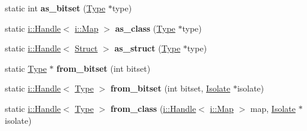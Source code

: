 \begin{DoxyCompactItemize}
\item 
\hypertarget{structv8_1_1internal_1_1_heap_type_config_a5cb05680ba0fa5241853ec9bc4a7a214}{}static int {\bfseries as\+\_\+bitset} (\hyperlink{classv8_1_1internal_1_1_type_impl}{Type} $\ast$type)\label{structv8_1_1internal_1_1_heap_type_config_a5cb05680ba0fa5241853ec9bc4a7a214}

\item 
\hypertarget{structv8_1_1internal_1_1_heap_type_config_ad7c5f1ca8b299f310a5259ac13e14752}{}static \hyperlink{classv8_1_1internal_1_1_handle}{i\+::\+Handle}$<$ \hyperlink{classv8_1_1internal_1_1_map}{i\+::\+Map} $>$ {\bfseries as\+\_\+class} (\hyperlink{classv8_1_1internal_1_1_type_impl}{Type} $\ast$type)\label{structv8_1_1internal_1_1_heap_type_config_ad7c5f1ca8b299f310a5259ac13e14752}

\item 
\hypertarget{structv8_1_1internal_1_1_heap_type_config_a49c6fa37428a4584c30160a0e1fafb88}{}static \hyperlink{classv8_1_1internal_1_1_handle}{i\+::\+Handle}$<$ \hyperlink{classv8_1_1internal_1_1_fixed_array}{Struct} $>$ {\bfseries as\+\_\+struct} (\hyperlink{classv8_1_1internal_1_1_type_impl}{Type} $\ast$type)\label{structv8_1_1internal_1_1_heap_type_config_a49c6fa37428a4584c30160a0e1fafb88}

\item 
\hypertarget{structv8_1_1internal_1_1_heap_type_config_a5f5aebc9ebfebb0388474c6743c71dad}{}static \hyperlink{classv8_1_1internal_1_1_type_impl}{Type} $\ast$ {\bfseries from\+\_\+bitset} (int bitset)\label{structv8_1_1internal_1_1_heap_type_config_a5f5aebc9ebfebb0388474c6743c71dad}

\item 
\hypertarget{structv8_1_1internal_1_1_heap_type_config_a9eed0fee9e85259a91b689d8840275ce}{}static \hyperlink{classv8_1_1internal_1_1_handle}{i\+::\+Handle}$<$ \hyperlink{classv8_1_1internal_1_1_type_impl}{Type} $>$ {\bfseries from\+\_\+bitset} (int bitset, \hyperlink{classv8_1_1internal_1_1_isolate}{Isolate} $\ast$isolate)\label{structv8_1_1internal_1_1_heap_type_config_a9eed0fee9e85259a91b689d8840275ce}

\item 
\hypertarget{structv8_1_1internal_1_1_heap_type_config_ac4e33514711a448a276408c9b92de7dc}{}static \hyperlink{classv8_1_1internal_1_1_handle}{i\+::\+Handle}$<$ \hyperlink{classv8_1_1internal_1_1_type_impl}{Type} $>$ {\bfseries from\+\_\+class} (\hyperlink{classv8_1_1internal_1_1_handle}{i\+::\+Handle}$<$ \hyperlink{classv8_1_1internal_1_1_map}{i\+::\+Map} $>$ map, \hyperlink{classv8_1_1internal_1_1_isolate}{Isolate} $\ast$isolate)\label{structv8_1_1internal_1_1_heap_type_config_ac4e33514711a448a276408c9b92de7dc}


\end{DoxyCompactItemize}
